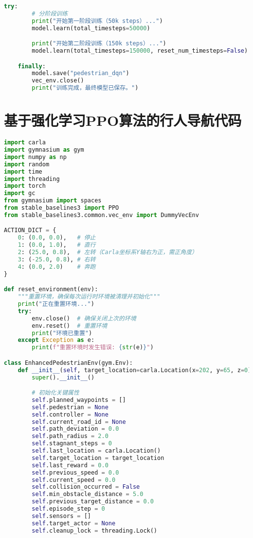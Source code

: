 \begin{lstlisting}[language=Python]
    try:
        # 分阶段训练
        print("开始第一阶段训练（50k steps）...")
        model.learn(total_timesteps=50000)

        print("开始第二阶段训练（150k steps）...")
        model.learn(total_timesteps=150000, reset_num_timesteps=False)

    finally:
        model.save("pedestrian_dqn")
        vec_env.close()
        print("训练完成，最终模型已保存。")
\end{lstlisting}

\section{基于强化学习PPO算法的行人导航代码}

\begin{lstlisting}[language=Python]
import carla
import gymnasium as gym
import numpy as np
import random
import time
import threading
import torch
import gc
from gymnasium import spaces
from stable_baselines3 import PPO
from stable_baselines3.common.vec_env import DummyVecEnv

ACTION_DICT = {
    0: (0.0, 0.0),   # 停止
    1: (0.0, 1.0),   # 直行
    2: (25.0, 0.8),  # 左转（Carla坐标系Y轴右为正，需正角度）
    3: (-25.0, 0.8), # 右转
    4: (0.0, 2.0)    # 奔跑
}

def reset_environment(env):
    """重置环境，确保每次运行时环境被清理并初始化"""
    print("正在重置环境...")
    try:
        env.close()  # 确保关闭上次的环境
        env.reset()  # 重置环境
        print("环境已重置")
    except Exception as e:
        print(f"重置环境时发生错误: {str(e)}")

class EnhancedPedestrianEnv(gym.Env):
    def __init__(self, target_location=carla.Location(x=202, y=65, z=0)):
        super().__init__()

        # 初始化关键属性
        self.planned_waypoints = []
        self.pedestrian = None
        self.controller = None
        self.current_road_id = None
        self.path_deviation = 0.0
        self.path_radius = 2.0
        self.stagnant_steps = 0
        self.last_location = carla.Location()
        self.target_location = target_location
        self.last_reward = 0.0
        self.previous_speed = 0.0
        self.current_speed = 0.0
        self.collision_occurred = False
        self.min_obstacle_distance = 5.0
        self.previous_target_distance = 0.0
        self.episode_step = 0
        self.sensors = []
        self.target_actor = None
        self.cleanup_lock = threading.Lock()


\end{lstlisting}
